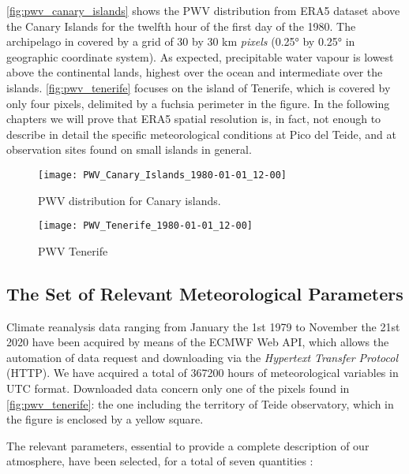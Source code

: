 \autoref{fig:pwv_canary_islands} shows the PWV distribution from ERA5
dataset above the Canary Islands for the twelfth hour of the first day of
the 1980. The archipelago in covered by a grid of \num{30} by \num{30}
\si{\kilo\meter} \emph{pixels}  (\ang{0.25} by \ang{0.25} in geographic
coordinate system).  As expected, precipitable water vapour is lowest above
the continental lands, highest over the ocean and intermediate over the
islands. \autoref{fig:pwv_tenerife} focuses on the island of Tenerife,
which is covered by only four pixels, delimited by a fuchsia perimeter in
the figure.  In the following chapters we will prove that ERA5 spatial
resolution is, in fact, not enough to describe in detail the specific
meteorological conditions at Pico del Teide, and at observation sites found
on small islands in general.

\begin{figure}
        \centering
        \texttt{[image: PWV\_Canary\_Islands\_1980-01-01\_12-00]}
        \caption{PWV distribution for Canary islands.}
        \label{fig:pwv_canary_islands}
\end{figure}

\begin{figure}
        \centering
        \texttt{[image: PWV\_Tenerife\_1980-01-01\_12-00]}
        \caption{PWV Tenerife}
        \label{fig:pwv_tenerife}
\end{figure}

\subsection{The Set of Relevant Meteorological Parameters}

Climate reanalysis data ranging from January the 1st 1979 to November the
21st 2020 have been acquired by means of the ECMWF Web API, which allows
the automation of data request and downloading via the \emph{Hypertext
Transfer Protocol} (HTTP). We have acquired a total of \num{367200} hours
of meteorological variables in UTC format. Downloaded data concern only one
of the pixels found in \autoref{fig:pwv_tenerife}: the one including the
territory of Teide observatory, which in the figure is enclosed by a yellow
square.

The relevant parameters, essential to provide a complete description of our
atmosphere, have been selected, for a total of seven quantities
\autocite{era5}:


